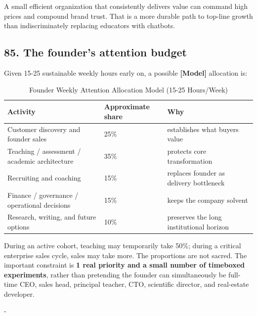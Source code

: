 A small efficient organization that consistently delivers value can command high prices and compound brand trust. That is a more durable path to top-line growth than indiscriminately replacing educators with chatbots.

\subsection{85. The founder's attention budget}

Given 15-25 sustainable weekly hours early on, a possible \textbf{\textbf{[Model]}} allocation is:

\begin{table}[t]
\centering
\small
\caption{Founder Weekly Attention Allocation Model (15-25 Hours/Week)}
\label{tab:ch36_attention_budget}
\begin{tabularx}{\textwidth}{p{4.5cm} p{2.2cm} X}
\toprule
\textbf{ Activity } & \textbf{ Approximate share } & \textbf{ Why } \\
\midrule
 Customer discovery and founder sales  &  25\%  &  establishes what buyers value  \\
 Teaching / assessment / academic architecture  &  35\%  &  protects core transformation  \\
 Recruiting and coaching  &  15\%  &  replaces founder as delivery bottleneck  \\
 Finance / governance / operational decisions  &  15\%  &  keeps the company solvent  \\
 Research, writing, and future options  &  10\%  &  preserves the long institutional horizon  \\
\bottomrule
\end{tabularx}
\end{table}

During an active cohort, teaching may temporarily take 50\%; during a critical enterprise sales cycle, sales may take more. The proportions are not sacred. The important constraint is \textbf{1 real priority and a small number of timeboxed experiments}, rather than pretending the founder can simultaneously be full-time CEO, sales head, principal teacher, CTO, scientific director, and real-estate developer.

-


